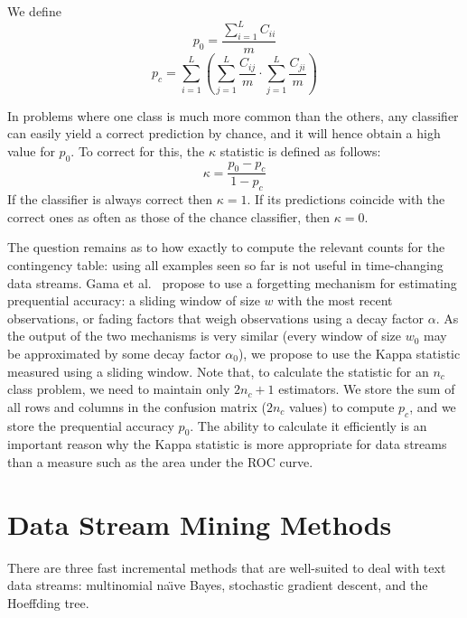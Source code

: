 We define
$$p_0= \frac{\sum^{L}_{i=1} C_{ii}}{m}$$
$$p_c = \sum^L_{i=1} \left( \sum^L_{j=1} \frac{C_{ij}}{m} \cdot
\sum^L_{j=1}\frac{C_{ji}}{m} \right) $$ 

In problems where one class is much more common than the others, any
classifier can easily yield a correct prediction by chance, and it
will hence obtain a high value for $p_0$.  To correct for this, the
$\kappa$ statistic is defined as follows:
$$ \kappa = \frac{p_0 -p_c}{1-p_c}$$
If the classifier is always correct then $\kappa = 1 $. If its
predictions coincide with the correct ones as often as those of the
chance classifier, then $\kappa = 0$.

The question remains as to how exactly to compute the relevant counts
for the contingency table: using all examples seen so far is not
useful in time-changing data streams.  Gama et al.~\cite{GamaSR09}
propose to use a forgetting mechanism for estimating prequential
accuracy: a sliding window of size $w$ with the most recent
observations, or fading factors that weigh observations using a decay
factor $\alpha$. As the output of the two mechanisms is very
similar (every window of size $w_0$ may be approximated by some decay
factor $\alpha_0$), we propose to use the Kappa statistic measured
using a sliding window. Note that, to calculate the statistic for an
$n_c$ class problem, we need to maintain only $2 n_c + 1$
estimators. We store the sum of all rows and columns in the confusion
matrix ($2 n_c$ values) to compute $p_c$, and we store the prequential
accuracy $p_0$. The ability to calculate it efficiently is an
important reason why the Kappa statistic is more appropriate for data
streams than a measure such as the area under the ROC curve.



\section{Data Stream Mining Methods}
\label{sec:methods}

There are  three fast incremental methods that are well-suited
to deal with text data streams: multinomial na\"{\i}ve Bayes, stochastic
gradient descent, and the Hoeffding tree.

